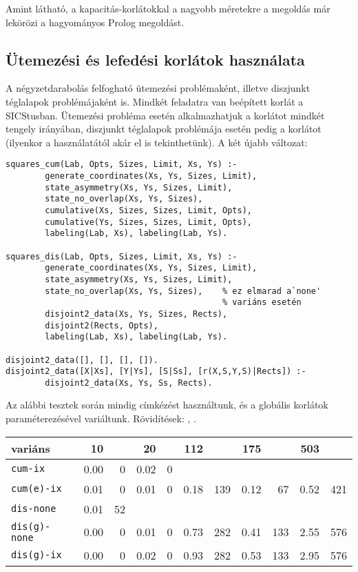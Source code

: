 Amint látható, a kapacitás-korlátokkal a nagyobb méretekre a \clpfd megoldás már
lekörözi a hagyományos Prolog megoldást.

\subsection{Ütemezési és lefedési korlátok használata}

A négyzetdarabolás felfogható ütemezési problémaként, illetve diszjunkt téglalapok
problémájaként is. Mindkét feladatra van beépített korlát a SICStusban. Ütemezési
probléma esetén alkalmazhatjuk a  korlátot mindkét tengely irányában,
diszjunkt téglalapok problémája esetén pedig a  korlátot (ilyenkor a
 használatától akár el is tekinthetünk).
\br
A két újabb változat:

\begin{verbatim}
squares_cum(Lab, Opts, Sizes, Limit, Xs, Ys) :-
        generate_coordinates(Xs, Ys, Sizes, Limit),
        state_asymmetry(Xs, Ys, Sizes, Limit),
        state_no_overlap(Xs, Ys, Sizes),
        cumulative(Xs, Sizes, Sizes, Limit, Opts),
        cumulative(Ys, Sizes, Sizes, Limit, Opts),
        labeling(Lab, Xs), labeling(Lab, Ys).

squares_dis(Lab, Opts, Sizes, Limit, Xs, Ys) :-
        generate_coordinates(Xs, Ys, Sizes, Limit),
        state_asymmetry(Xs, Ys, Sizes, Limit),
        state_no_overlap(Xs, Ys, Sizes),    % ez elmarad a`none'
                                            % variáns esetén
        disjoint2_data(Xs, Ys, Sizes, Rects),
        disjoint2(Rects, Opts),
        labeling(Lab, Xs), labeling(Lab, Ys).

disjoint2_data([], [], [], []).
disjoint2_data([X|Xs], [Y|Ys], [S|Ss], [r(X,S,Y,S)|Rects]) :-
        disjoint2_data(Xs, Ys, Ss, Rects).
\end{verbatim}

Az alábbi tesztek során mindig \cd{[min]} címkézést használtunk, és a globális
korlátok paraméterezésével variáltunk. Rövidítések: ,
.

\begin{center}
\begin{tabular}{|l|rr|rr|rr|rr|rr|}
\hline
variáns   & 10     &      &  20   &      & 112    &      & 175   &    & 503  &\\
\hline
{\tt cum-ix}      &  0.00&    0&  0.02&    0&       &     &       &     &       &     \\
{\tt cum(e)-ix}   &  0.01&    0&  0.01&    0&  0.18&  139&  0.12&   67&  0.52&  421\\
\hline
{\tt dis-none}    &  0.01&   52&       &     &       &     &       &     &       &     \\
{\tt dis(g)-none} &  0.00&    0&  0.01&    0&  0.73&  282&  0.41&  133&  2.55&  576\\
{\tt dis(g)-ix}   &  0.00&    0&  0.02&    0&  0.93&  282&  0.53&  133&  2.95&  576\\
\hline
\end{tabular}
\end{center}

